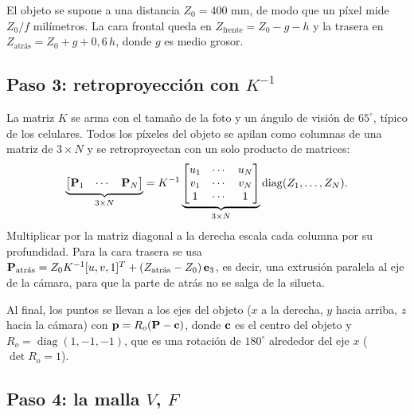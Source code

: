 El objeto se supone a una distancia $Z_0=400$ mm, de modo que un píxel mide
$Z_0/f$ milímetros. La cara frontal queda en $Z_{\text{frente}}=Z_0-g-h$ y la
trasera en $Z_{\text{atrás}}=Z_0+g+0{,}6\,h$, donde $g$ es medio grosor.



\subsection{Paso 3: retroproyección con \texorpdfstring{$K^{-1}$}{K inversa}}

La matriz $K$ se arma con el tamaño de la foto y un ángulo de visión de
$65^\circ$, típico de los celulares. Todos los píxeles del objeto se apilan
como columnas de una matriz de $3\times N$ y se retroproyectan con un solo
producto de matrices:
\begin{equation}
\underbrace{\begin{bmatrix} \mathbf{P}_1 & \cdots & \mathbf{P}_N \end{bmatrix}}_{3\times N}
= K^{-1}
\underbrace{\begin{bmatrix} u_1 & \cdots & u_N\\ v_1 & \cdots & v_N\\ 1 & \cdots & 1 \end{bmatrix}}_{3\times N}
\operatorname{diag}(Z_1,\dots,Z_N).
\end{equation}
Multiplicar por la matriz diagonal a la derecha escala cada columna por su
profundidad. Para la cara trasera se usa
$\mathbf{P}_{\text{atrás}}=Z_0K^{-1}[u,v,1]^{T}+(Z_{\text{atrás}}-Z_0)\,\mathbf{e}_3$,
es decir, una extrusión paralela al eje de la cámara, para que la parte de
atrás no se salga de la silueta.

Al final, los puntos se llevan a los ejes del objeto ($x$ a la derecha, $y$
hacia arriba, $z$ hacia la cámara) con $\mathbf{p}=R_o(\mathbf{P}-\mathbf{c})$, donde
$\mathbf{c}$ es el centro del objeto y $R_o=\operatorname{diag}(1,-1,-1)$, que
es una rotación de $180^\circ$ alrededor del eje $x$ ($\det R_o=1$).









\subsection{Paso 4: la malla \texorpdfstring{$V$, $F$}{V, F}}

